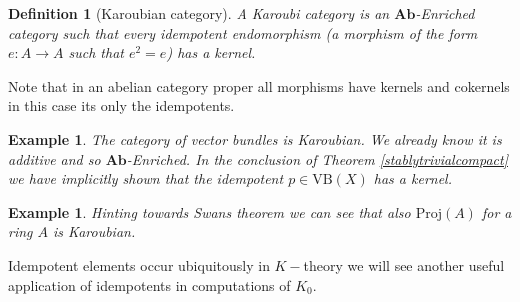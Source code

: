 \documentclass[12pt]{report}
\numberwithin{equation}{section}
\newtheorem{definition}[dummy]{Definition}
\newtheorem{example}[dummy]{Example}
\begin{document}
	\begin{definition}[Karoubian category]
		A Karoubi category is an $\mathbf{Ab}$-Enriched category such that every idempotent endomorphism (a morphism of the form $e:A \to A$ such that $e^2=e$) has a kernel.
	\end{definition}
	Note that in an abelian category proper all morphisms have kernels and cokernels in this case its only the idempotents.
	\begin{example}
		The category of vector bundles is Karoubian. We already know it is additive and so $\mathbf{Ab}$-Enriched. In the conclusion of Theorem \ref{stablytrivialcompact} we have implicitly shown that the idempotent $p \in \mathrm{VB}(X)$ has a kernel.
	\end{example}
	\begin{example}
		Hinting towards Swans theorem we can see that also $\mathrm{Proj}(A)$ for a ring $A$ is Karoubian.
	\end{example}
	Idempotent elements occur ubiquitously in $K-$theory we will see another useful application of idempotents in computations of $K_0$.
	
\end{document}
